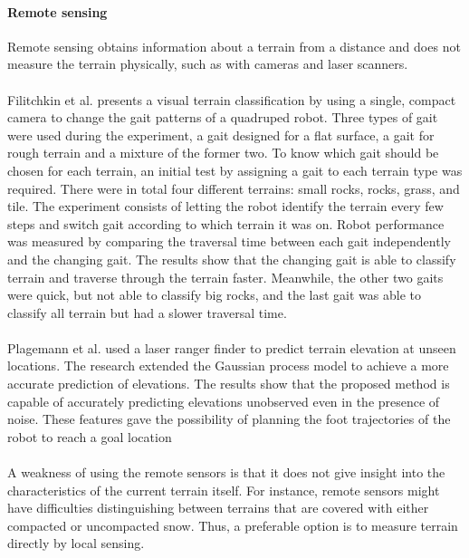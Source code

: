\documentclass[USenglish]{ifimaster}  %
\begin{document}
\paragraph{Remote sensing}
Remote sensing obtains information about a terrain from a distance and does not measure the terrain physically, such as with cameras and laser scanners. 
\\
\\ 
Filitchkin et al. \cite{littleDog} presents a visual terrain classification by using a single, compact camera to change the gait patterns of a quadruped robot. Three
types of gait were used during the experiment, a gait designed for a flat surface, a gait for rough terrain and a mixture of the former two. To know which gait should be chosen for each terrain, an initial test by assigning a gait to each terrain type was required. There were in total four different terrains: small rocks, rocks, grass, and tile. The experiment consists of letting the robot identify the terrain every few steps and switch gait according to which terrain it was on. Robot performance was measured by comparing the traversal time between each gait independently and the changing gait. The results show that the changing gait is able to classify terrain and traverse through the terrain faster. Meanwhile, the other two gaits were quick, but not able to classify big rocks, and the last gait was able to classify all terrain but had a slower traversal time.
\\
\\
Plagemann et al. \cite{4651026} used a laser ranger finder to predict terrain elevation
at unseen locations. The research extended the Gaussian process model to achieve a more accurate prediction of elevations. The results show that the proposed method is capable of accurately predicting elevations unobserved even in the presence of noise. These features gave the possibility of planning the foot trajectories of the robot to reach a goal location
\\
\\
A weakness of using the remote sensors is that it does not give insight into the characteristics of the current terrain itself. For instance, remote sensors might have difficulties distinguishing between terrains that are covered with either compacted or uncompacted snow. Thus, a preferable option is to measure terrain directly by local sensing.

	
\end{document}
